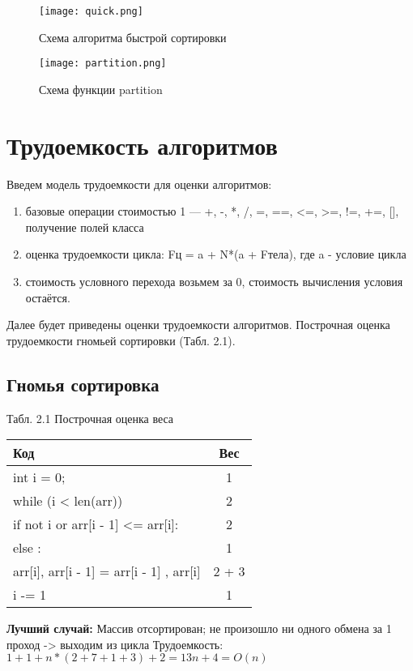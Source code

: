 \documentclass[12pt]{report}
\begin{document}
	\newpage
	\begin{figure}[h]
		\texttt{[image: quick.png]}
		\caption{Схема алгоритма быстрой сортировки}
		\label{ris:imageSQ}
	\end{figure}
	
	\newpage
	\begin{figure}[h]
		\texttt{[image: partition.png]}
		\caption{Схема функции partition}
		\label{ris:imageSP}
	\end{figure}
	
	
	\section{Трудоемкость алгоритмов}
	Введем модель трудоемкости для оценки алгоритмов:
	\begin{enumerate}
		\item  базовые операции стоимостью 1 — +, -, *, /, =, ==, <=, >=, !=, +=, [], получение полей класса
		\item оценка трудоемкости цикла: Fц = a + N*(a + Fтела), где a - условие цикла
		\item стоимость условного перехода возьмем за 0, стоимость вычисления условия остаётся.
	\end{enumerate}
	
	Далее будет приведены оценки трудоемкости алгоритмов. Построчная оценка трудоемкости гномьей сортировки (Табл. 2.1).
	
	\subsection{Гномья сортировка}
	\begin{center}
		Табл. 2.1 Построчная оценка веса
		\begin{tabular}{|l c|} 
			\hline
			Код & Вес \\ [0.5ex] 
			\hline\hline
			int i = 0; & 1\\
			\hline
			while (i < len(arr)) & 2\\
			\hline
			if not i or arr[i - 1] <= arr[i]: & 2\\
			\hline
			else : & 1\\
			\hline
			arr[i], arr[i - 1] = arr[i - 1] , arr[i] & 2 + 3\\
			\hline
			i -= 1 & 1\\
			\hline
		\end{tabular}
	\end{center}
	
	
	\textbf{Лучший случай:} Массив отсортирован; не произошло ни одного обмена за 1 проход -> выходим из цикла \newline
	Трудоемкость:  $1 + 1 + n* (2 + 7 + 1 + 3 ) + 2 = 13n + 4 = O(n)$
	
\end{document}
